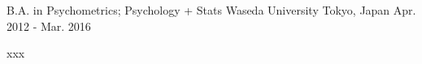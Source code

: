 

\begin{cventries}

  \cventry
    {B.A. in Psychometrics; Psychology + Stats} %
    {Waseda University} %
    {Tokyo, Japan} %
    {Apr. 2012 - Mar. 2016} %
    {
      \begin{cvitems} %
        \item {xxx}
      \end{cvitems}
    }

\end{cventries}
